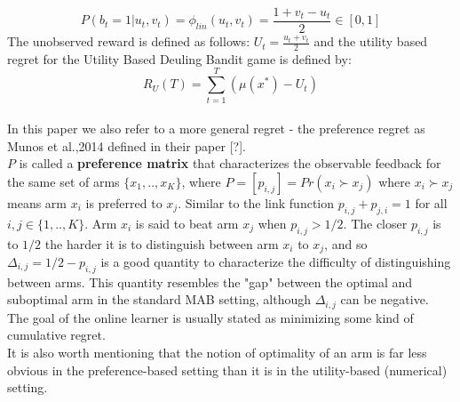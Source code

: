 \documentclass{llncs}
\begin{document}
	$$P(b_t = 1|u_t, v_t) = \phi_{lin}(u_t, v_t) = \frac{1+v_t-u_t}{2}\in [0,1]$$
	The unobserved reward is defined as follows: $ U_t = \frac{u_t+v_t}{2}$	 and the utility based regret for the Utility Based Deuling Bandit game is defined by:
	$$ R_U(T) = \sum_{t=1}^T(\mu(x^*)- U_t)$$
	\\	
	In this paper we also refer to a more general regret - the preference regret as Munos et al.,2014 defined in their paper [?].
\\
$P$ is called a {\bf preference matrix} that characterizes the observable feedback for the same set of arms $\{x_1,..,x_K\}$, where 
$P = [p_{i,j}] = Pr(x_i \succ x_j)$ where $x_i \succ x_j$ means arm $x_i$ is preferred to $x_j$. Similar to the link function $p_{i,j} + p_{j,i} = 1$ for all $i,j \in \{1,..,K\}$. Arm $x_i$ is said to beat arm $x_j$ when  $p_{i,j} > 1/2$. The closer $p_{i,j} $ is to $ 1/2$ the harder it is to distinguish between arm $x_i$ to $x_j$, and so $\Delta_{i,j} = 1/2 - p_{i,j}$ is a good quantity to characterize the  difficulty of distinguishing between arms. This quantity resembles the "gap" between the optimal and suboptimal arm in the standard MAB setting, although $\Delta_{i,j}$ can be negative.
\\
The goal of the online learner is usually stated as minimizing some kind of cumulative regret.
\\
It is also worth mentioning that the notion of optimality of an arm is far less obvious in the preference-based setting than it is in the utility-based (numerical) setting. 
\end{document}
